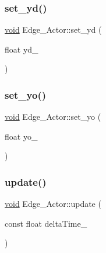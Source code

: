 \mbox{\label{classEdge__Actor_a0e73953b56bb2da81152e91ebb17e6ed}} 
\subsubsection{\texorpdfstring{set\+\_\+yd()}{set\_yd()}}
{\footnotesize\ttfamily \hyperlink{imgui__impl__opengl3__loader_8h_ac668e7cffd9e2e9cfee428b9b2f34fa7}{void} Edge\+\_\+\+Actor\+::set\+\_\+yd (\begin{DoxyParamCaption}\item[{float}]{yd\+\_\+ }\end{DoxyParamCaption})\hspace{0.3cm}{\ttfamily [inline]}}

\mbox{\label{classEdge__Actor_a98b808c09e6697fba4d1bf0d51ba0af0}} 
\subsubsection{\texorpdfstring{set\+\_\+yo()}{set\_yo()}}
{\footnotesize\ttfamily \hyperlink{imgui__impl__opengl3__loader_8h_ac668e7cffd9e2e9cfee428b9b2f34fa7}{void} Edge\+\_\+\+Actor\+::set\+\_\+yo (\begin{DoxyParamCaption}\item[{float}]{yo\+\_\+ }\end{DoxyParamCaption})\hspace{0.3cm}{\ttfamily [inline]}}

\mbox{\label{classEdge__Actor_a8ae8a19c72b58522755d2d0a395fc1ea}} 
\subsubsection{\texorpdfstring{update()}{update()}}
{\footnotesize\ttfamily \hyperlink{imgui__impl__opengl3__loader_8h_ac668e7cffd9e2e9cfee428b9b2f34fa7}{void} Edge\+\_\+\+Actor\+::update (\begin{DoxyParamCaption}\item[{const float}]{delta\+Time\+\_\+ }\end{DoxyParamCaption})\hspace{0.3cm}{\ttfamily [virtual]}}



